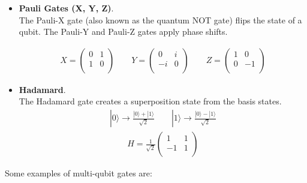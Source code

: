 \begin{itemize}
    \item \textbf{Pauli Gates (X, Y, Z)}.\\
    The Pauli-X gate (also known as the quantum NOT gate) 
    flips the state of a qubit. The Pauli-Y and Pauli-Z gates apply phase shifts.

    \begin{align}
    X = \begin{pmatrix}
        0 & 1 \\
        1 & 0 \\
    \end{pmatrix}
    \qquad
    Y = \begin{pmatrix}
        0 & i \\
        -i & 0 \\
    \end{pmatrix}
    \qquad
    Z = \begin{pmatrix}
        1 & 0 \\
        0 & -1 \\
    \end{pmatrix}
    \end{align}

    \item \textbf{Hadamard}.\\
    The Hadamard gate creates a superposition state from the basis states.
    \begin{align}
        | 0 \rangle \rightarrow \frac{| 0 \rangle + | 1 \rangle}{\sqrt{2}}
        \qquad 
        | 1 \rangle \rightarrow \frac{| 0 \rangle - | 1 \rangle}{\sqrt{2}}
    \end{align}
    \begin{align}
        H = \frac{1}{\sqrt{2}}\begin{pmatrix}
            1 & 1 \\
            -1 & 1 \\
        \end{pmatrix}
    \end{align}    
\end{itemize}

Some examples of multi-qubit gates are:

